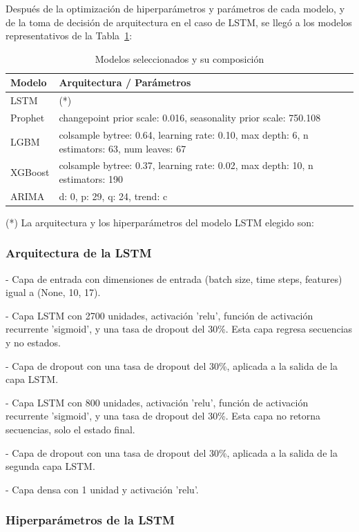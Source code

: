 Después de la optimización de hiperparámetros y parámetros de cada modelo, y de la toma de decisión de arquitectura en el caso de LSTM, se llegó a los modelos representativos de la Tabla~\ref{tab:modelos_seleccionados}:
\begin{table}[htbp]
\centering
\small
\begin{tabular}{lp{9.5cm}}
\toprule
Modelo & Arquitectura / Parámetros\\
\midrule
LSTM & (*) \\
Prophet & changepoint prior scale: 0.016, seasonality prior scale: 750.108 \\
LGBM & colsample bytree: 0.64, learning rate: 0.10, max depth: 6, n estimators: 63, num leaves: 67 \\
XGBoost & colsample bytree: 0.37, learning rate: 0.02,  max depth: 10, n estimators: 190 \\
ARIMA & d: 0, p: 29, q: 24, trend: c \\
\bottomrule
\end{tabular}
\caption{Modelos seleccionados y su composición}
\label{tab:modelos_seleccionados}
\end{table}


(*) La arquitectura y los hiperparámetros del modelo LSTM elegido son:

\subsubsection*{Arquitectura de la LSTM}

- Capa de entrada con dimensiones de entrada (batch size, time steps, features) igual a (None, 10, 17).

- Capa LSTM con 2700 unidades, activación 'relu', función de activación recurrente 'sigmoid', y una tasa de dropout del 30\%. Esta capa regresa secuencias y no estados.

- Capa de dropout con una tasa de dropout del 30\%, aplicada a la salida de la capa LSTM.

- Capa LSTM con 800 unidades, activación 'relu', función de activación recurrente 'sigmoid', y una tasa de dropout del 30\%. Esta capa no retorna secuencias, solo el estado final.

- Capa de dropout con una tasa de dropout del 30\%, aplicada a la salida de la segunda capa LSTM.

- Capa densa con 1 unidad y activación 'relu'.

\subsubsection*{Hiperparámetros de la LSTM}

